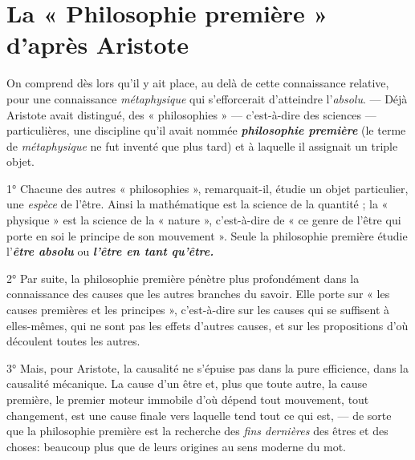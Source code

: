 \section{La « Philosophie première » d’après Aristote}%
On comprend dès lors qu’il y ait place, au delà de cette connaissance relative,
pour une connaissance {\it métaphysique} qui s’efforcerait d'atteindre
l'{\it absolu}. — Déjà Aristote avait distingué, des « philosophies » —
c’est-à-dire des sciences — particulières, une discipline qu'il avait
nommée \textbf{\textit {philosophie première}} (le terme de {\it métaphysique} ne fut inventé
que plus tard) et à laquelle il assignait un triple objet.

1° Chacune des autres « philosophies », remarquait-il, étudie un
objet particulier, une {\it espèce} de l’être. Ainsi la mathématique est la
science de la quantité ; la « physique » est la science de la « nature »,
c'est-à-dire de « ce genre de l’être qui porte en soi le principe de son
mouvement ». Seule la philosophie première étudie l'\textbf{\textit {être absolu}} ou
\textbf{\textit {l'être en tant qu’être.}}

2° Par suite, la philosophie première pénètre plus profondément dans
la connaissance des causes que les autres branches du savoir. Elle porte
sur « les causes premières et les principes », c’est-à-dire sur les causes
qui se suffisent à elles-mêmes, qui ne sont pas les effets d’autres causes,
et sur les propositions d’où découlent toutes les autres.

3° Mais, pour Aristote, la causalité ne s’épuise pas dans la pure
efficience, dans la causalité mécanique. La cause d’un être et, plus que
toute autre, la cause première, le premier moteur immobile d’où
dépend tout mouvement, tout changement, est une cause finale vers
laquelle tend tout ce qui est, — de sorte que la philosophie première
est la recherche des {\it fins dernières} des êtres et des choses: beaucoup plus
que de leurs origines au sens moderne du mot.

